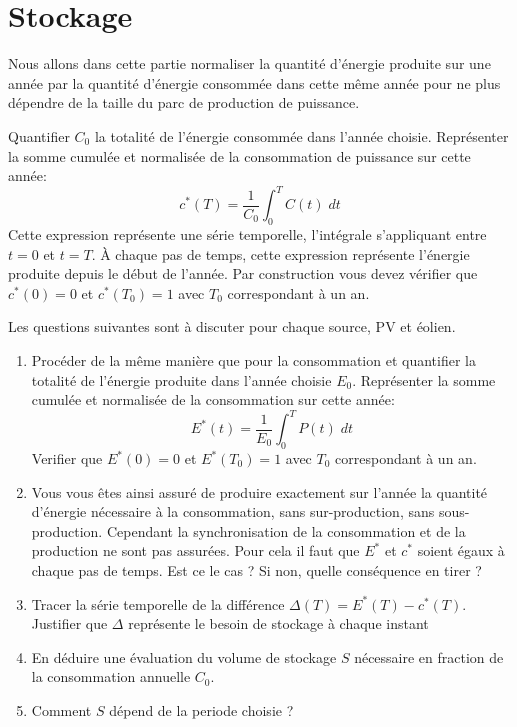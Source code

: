 \documentclass[12pt,a4]{article}
\begin{document}
\section{Stockage}
Nous allons dans cette partie normaliser la quantité d'énergie produite sur une année par la quantité d'énergie consommée dans cette même année pour ne plus dépendre de la taille du parc de production de puissance.

Quantifier $C_0$ la totalité de l'énergie consommée dans l'année choisie. Représenter la somme cumulée et normalisée de la consommation de puissance sur cette année:
\begin{equation}
	c^*(T)  = \frac{1}{C_0} \int_{0}^{T}C(t) \; d t	
\end{equation}
Cette expression représente une série temporelle, l'intégrale  s'appliquant entre $t=0$ et $t=T$. À chaque pas de temps, cette expression représente l'énergie produite depuis le début de l'année. Par construction vous devez vérifier que $c^*(0)=0$ et $c^*(T_0)=1$ avec $T_0$ correspondant à un an. 


Les questions suivantes sont à discuter pour chaque source, PV et éolien.
\begin{enumerate}
	\item Procéder de la même manière que pour la consommation et quantifier la totalité de l'énergie produite dans l'année choisie $E_0$. Représenter la somme cumulée et normalisée de la consommation sur cette année: 
	\begin{equation}
	E^*(t)  = \frac{1}{E_0} \int_{0}^{T} P(t) \; d t	
	\end{equation}
	Verifier que $E^*(0)=0$ et $E^*(T_0)=1$ avec $T_0$ correspondant à un an. 
	\item Vous vous êtes ainsi assuré de produire exactement sur l'année la quantité d'énergie nécessaire à la consommation, sans sur-production, sans sous-production. Cependant la synchronisation de la consommation et de la production ne sont pas assurées. Pour cela il faut que $E^*$ et $c^*$ soient égaux à chaque pas de temps. Est ce le cas ? Si non, quelle conséquence en tirer ?
	\item Tracer la série temporelle de la différence $\Delta(T) = E^*(T) - c^*(T)$. Justifier que $\Delta $ représente le besoin de stockage à chaque instant
	\item En déduire une évaluation du volume de stockage $S$ nécessaire en fraction de la consommation annuelle $C_0$.
	\item Comment $S$ dépend de la periode choisie ?
	
\end{enumerate}
\end{document}
